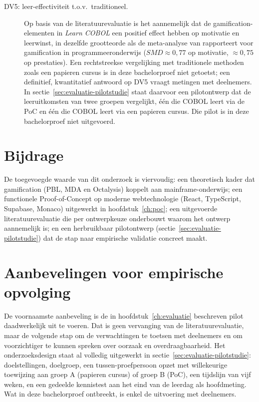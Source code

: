\begin{description}
    \item[DV5: leer-effectiviteit t.o.v.\ traditioneel.] Op basis van de literatuurevaluatie is het aannemelijk dat de gamification-elementen in \textit{Learn COBOL} een positief effect hebben op motivatie en leerwinst, in dezelfde grootteorde als de meta-analyse van \textcite{Zhan2022} rapporteert voor gamification in programmeeronderwijs (\(SMD \approx 0{,}77\) op motivatie, \(\approx 0{,}75\) op prestaties). Een rechtstreekse vergelijking met traditionele methoden zoals een papieren cursus is in deze bachelorproef niet getoetst; een definitief, kwantitatief antwoord op DV5 vraagt metingen met deelnemers. In sectie~\ref{sec:evaluatie-pilotstudie} staat daarvoor een pilotontwerp dat de leeruitkomsten van twee groepen vergelijkt, één die COBOL leert via de PoC en één die COBOL leert via een papieren cursus. Die pilot is in deze bachelorproef niet uitgevoerd.
\end{description}

\section{Bijdrage}

De toegevoegde waarde van dit onderzoek is viervoudig: een theoretisch kader dat gamification (PBL, MDA en Octalysis) koppelt aan mainframe-onderwijs; een functionele Proof-of-Concept op moderne webtechnologie (React, TypeScript, Supabase, Monaco) uitgewerkt in hoofdstuk~\ref{ch:poc}; een uitgevoerde literatuurevaluatie die per ontwerpkeuze onderbouwt waarom het ontwerp aannemelijk is; en een herbruikbaar pilotontwerp (sectie~\ref{sec:evaluatie-pilotstudie}) dat de stap naar empirische validatie concreet maakt.

\section{Aanbevelingen voor empirische opvolging}
\label{sec:conclusie-empirische-opvolging}

De voornaamste aanbeveling is de in hoofdstuk~\ref{ch:evaluatie} beschreven pilot daadwerkelijk uit te voeren. Dat is geen vervanging van de literatuurevaluatie, maar de volgende stap om de verwachtingen te toetsen met deelnemers en om voorzichtiger te kunnen spreken over oorzaak en overdraagbaarheid.
Het onderzoeksdesign staat al volledig uitgewerkt in sectie~\ref{sec:evaluatie-pilotstudie}: doelstellingen, doelgroep, een tussen-proefpersoon opzet met willekeurige toewijzing aan groep A (papieren cursus) of groep B (PoC), een tijdslijn van vijf weken, en een gedeelde kennistest aan het eind van de leerdag als hoofdmeting.
Wat in deze bachelorproef ontbreekt, is enkel de uitvoering met deelnemers.